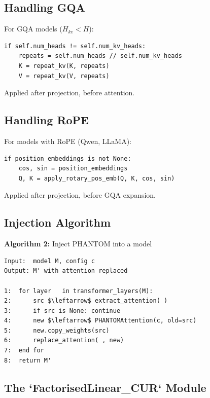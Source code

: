 \subsection{Handling GQA}

For GQA models ($H_{kv} < H$):

\begin{lstlisting}
if self.num_heads != self.num_kv_heads:
    repeats = self.num_heads // self.num_kv_heads
    K = repeat_kv(K, repeats)
    V = repeat_kv(V, repeats)
\end{lstlisting}

Applied after projection, before attention.

\subsection{Handling RoPE}

For models with RoPE (Qwen, LLaMA):

\begin{lstlisting}
if position_embeddings is not None:
    cos, sin = position_embeddings
    Q, K = apply_rotary_pos_emb(Q, K, cos, sin)
\end{lstlisting}

Applied after projection, before GQA expansion.

\subsection{Injection Algorithm}

\textbf{Algorithm 2:} Inject PHANTOM into a model
\begin{lstlisting}
Input:  model M, config c
Output: M' with attention replaced

1:  for layer   in transformer_layers(M):
2:      src $\leftarrow$ extract_attention( )
3:      if src is None: continue
4:      new $\leftarrow$ PHANTOMAttention(c, old=src)
5:      new.copy_weights(src)
6:      replace_attention( , new)
7:  end for
8:  return M'
\end{lstlisting}

\subsection{The `FactorisedLinear\_CUR` Module}

